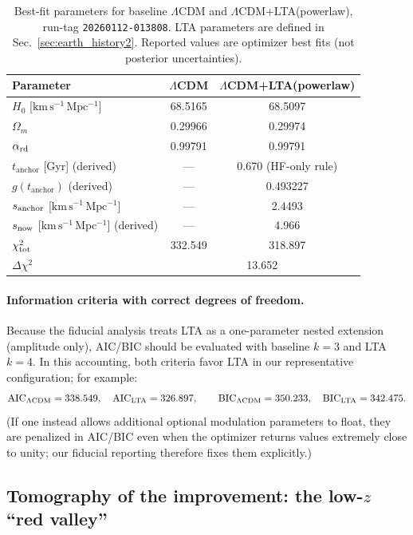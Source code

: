 \documentclass[10pt]{article}
\newcommand{\kmsMpc}{\mathrm{km\,s^{-1}\,Mpc^{-1}}}
\newcommand{\tA}{t_{\mathrm{anchor}}}
\begin{document}
\begin{table}[!htbp]
\centering
\small
\caption{Best-fit parameters for baseline $\Lambda$CDM and $\Lambda$CDM+LTA(powerlaw),
run-tag \texttt{20260112-013808}. LTA parameters are defined in Sec.~\ref{sec:earth_history2}.
Reported values are optimizer best fits (not posterior uncertainties).}
\label{tab:bestfit_params}
\begin{tabular}{lcc}
\toprule
Parameter & $\Lambda$CDM & $\Lambda$CDM+LTA(powerlaw) \\
\midrule
$H_0$ [$\kmsMpc$]        & 68.5165 & 68.5097 \\
$\Omega_m$              & 0.29966 & 0.29974 \\
$\alpha_{\rm rd}$       & 0.99791 & 0.99791 \\
\midrule
$\tA$ [Gyr] (derived)    & ---     & 0.670 (HF-only rule) \\
$g(\tA)$ (derived)       & ---     & 0.493227 \\
$s_{\rm anchor}$ [$\kmsMpc$] & --- & 2.4493 \\
$s_{\rm now}$ [$\kmsMpc$] (derived) & --- & 4.966 \\
\midrule
$\chi^2_{\rm tot}$       & 332.549 & 318.897 \\
$\Delta\chi^2$           & \multicolumn{2}{c}{13.652} \\
\bottomrule
\end{tabular}
\end{table}

\paragraph{Information criteria with correct degrees of freedom.}
Because the fiducial analysis treats LTA as a one-parameter nested extension (amplitude only),
AIC/BIC should be evaluated with baseline \(k=3\) and LTA \(k=4\).
In this accounting, both criteria favor LTA in our representative configuration; for example:
\begin{equation}
{\rm AIC}_{\Lambda{\rm CDM}}=338.549,\quad {\rm AIC}_{\rm LTA}=326.897,
\qquad
{\rm BIC}_{\Lambda{\rm CDM}}=350.233,\quad {\rm BIC}_{\rm LTA}=342.475.
\end{equation}
(If one instead allows additional optional modulation parameters to float, they are penalized in
AIC/BIC even when the optimizer returns values extremely close to unity; our fiducial reporting
therefore fixes them explicitly.)

\subsection{Tomography of the improvement: the low-$z$ ``red valley''}
\label{sec:results_tomography}
\end{document}
